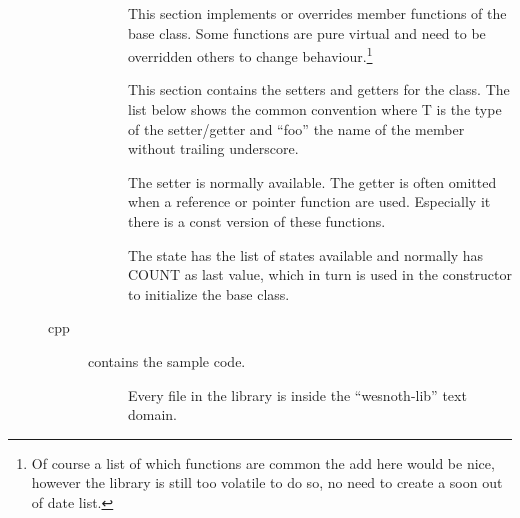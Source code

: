 \begin{description}
\begin{description}
\begin{description}
	\item[]
		This section implements or overrides member functions of the base class.
		Some functions are pure virtual and need to be overridden others to
		change behaviour.\footnote{Of course a list of which functions are
		common the add here would be nice, however the library is still too
		volatile to do so, no need to create a soon out of date list.}

	\item[]
		This section contains the setters and getters for the class. The
		list below shows the common convention where T is the type of the
		setter/getter and ``foo'' the name of the member without trailing
		underscore.


		The setter is normally available. The getter is often omitted when a
		reference or pointer function are used. Especially it there is a const
		version of these functions.

	\item[]
		The state has the list of states available and normally has COUNT as
		last value, which in turn is used in the constructor to initialize the
		base class.

	\end{description}

\item[cpp]  contains the sample code. 
	\begin{description}
	\item[] Every file in the library
		is inside the ``wesnoth-lib'' text domain.


\end{description}
\end{description}
\end{description}

